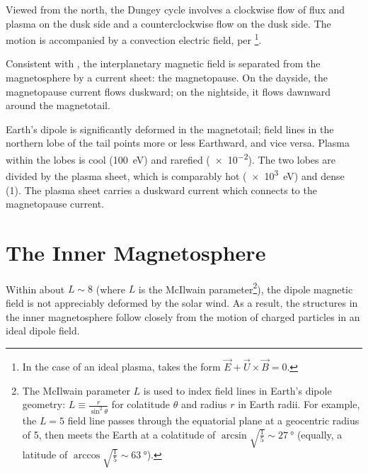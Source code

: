 Viewed from the north, the Dungey cycle involves a clockwise flow of flux and plasma on the dusk side and a counterclockwise flow on the dusk side. The motion is accompanied by a convection electric field, per \ohmlaw\footnote{In the case of an ideal plasma, \ohmlaw takes the form $\vec{E} + \vec{U} \times \vec{B} = 0$. }. 


Consistent with \amplaw, the interplanetary magnetic field is separated from the magnetosphere by a current sheet: the magnetopause. On the dayside, the magnetopause current flows duskward; on the nightside, it flows dawnward around the magnetotail. 

Earth's dipole is significantly deformed in the magnetotail; field lines in the northern lobe of the tail points more or less Earthward, and vice versa. Plasma within the lobes is cool (\about\SI{100}{\eV}) and rarefied (\about\SI{e-2}{\percc}). The two lobes are divided by the plasma sheet, which is comparably hot (\about\SI{e3}{\eV}) and dense (\about\SI{1}{\percc}). The plasma sheet carries a duskward current which connects to the magnetopause current. 

\section{The Inner Magnetosphere}

Within about $L \sim 8$ (where $L$ is the McIlwain parameter\footnote{The McIlwain parameter $L$ is used to index field lines in Earth's dipole geometry: $L \equiv \frac{r}{\sin^2\theta}$ for colatitude $\theta$ and radius $r$ in Earth radii. For example, the $L=5$ field line passes through the equatorial plane at a geocentric radius of \SI{5}{\RE}, then meets the Earth at a colatitude of $\arcsin \sqrt{ \frac{1}{5} } \sim \SI{27}{\degree}$ (equally, a latitude of $\arccos \sqrt{ \frac{1}{5} } \sim \SI{63}{\degree}$). }), the dipole magnetic field is not appreciably deformed by the solar wind. As a result, the structures in the inner magnetosphere follow closely from the motion of charged particles in an ideal dipole field. 

